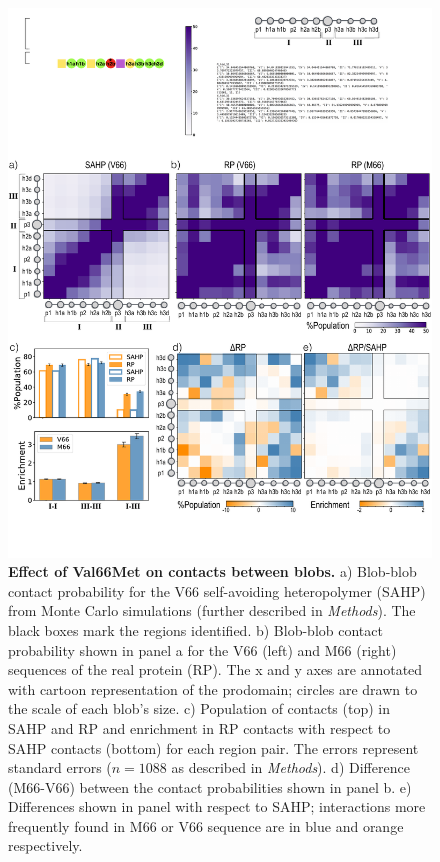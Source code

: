 \documentclass[10pt,letterpaper]{article}
\begin{document}
\begin{figure}[!ht]
\includegraphics[scale=0.3,width=\textwidth,trim={0 0cm 0 0cm},clip]{./figures/fig5.pdf}
\caption{{\bf Effect of Val66Met on contacts between blobs.} a) Blob-blob contact probability for the V66 self-avoiding heteropolymer (SAHP) from Monte Carlo simulations (further described in {\it Methods}). The black boxes mark the regions identified. b) Blob-blob contact probability shown in panel a for the V66 (left) and M66 (right) sequences of the real protein (RP). The x and y axes are annotated with cartoon representation of the prodomain; circles are drawn to the scale of each blob's size. c) Population of contacts (top) in SAHP and RP  and enrichment in RP contacts with respect to SAHP contacts (bottom) for each region pair. The errors represent standard errors ($n =1088$ as described in {\it Methods}). d) Difference (M66-V66) between the contact probabilities shown in panel b. e) Differences shown in panel with respect to SAHP; interactions more frequently found in M66 or V66 sequence are in blue and orange respectively.}
\label{fig5}
\end{figure}
\end{document}

